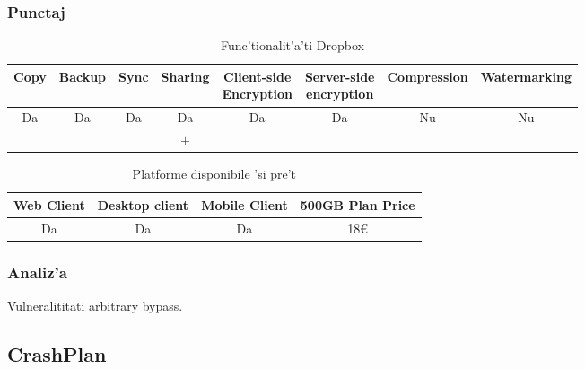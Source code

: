 \documentclass[12pt,a4paper,twoside]{report}
\newcommand{\greencheck}{\color{green}  \ding{51}}
\newcommand{\orangepm}{\color{orange} \textbf{$\pm$}}
\newcommand{\redxmark}{\color{red} \ding{55}}
\begin{document}
\subsubsection{Punctaj}
\begin{table}[H]
\centering
\caption{Func'tionalit'a'ti Dropbox}
\begin{tabular}{|c|c|c|c|c|c|c|c|}          
\hline               
Copy & Backup & Sync & Sharing & \makecell{Client-side\\ Encryption} & \makecell{Server-side \\ encryption} & Compression & Watermarking \\ [0.5ex]   
\hline 
Da & Da & Da & Da & Da &  Da  & Nu & Nu    \\                      
\greencheck & \greencheck & \redxmark\redxmark & \orangepm & \greencheck\greencheck & \greencheck\greencheck &  \redxmark\redxmark &  \redxmark\redxmark  \\               
\hline                              
\end{tabular}
\label{table:dropboxfeaturetable}             
\end{table}
\begin{table}[H]
\centering
\caption{Platforme disponibile 'si pre't}
\begin{tabular}{|c|c|c|c|}          
\hline                      
 Web Client & Desktop client & Mobile Client & 500GB Plan Price\\ [0.5ex]   
\hline                            
Da & Da & Da & 18\euro \\               
\hline                              
\end{tabular}
\label{table:dropboxsystemtable}             
\end{table}
\subsubsection{Analiz'a}
Vulneralititati arbitrary bypass.

\subsection{CrashPlan}
\end{document}

